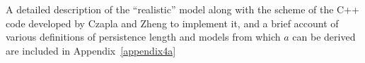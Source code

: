 A detailed description of the  ``realistic'' model along with the scheme
of the C++  code developed by Czapla and Zheng to  implement it, and a
brief account of various  definitions of persistence length and models
from which $a$ can be derived are included in Appendix~\ref{appendix4a}





